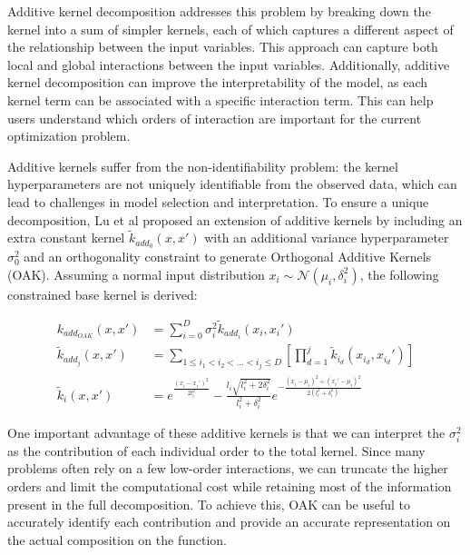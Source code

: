 \documentclass[sn-mathphys,Numbered]{sn-jnl}%
\begin{document}
Additive kernel decomposition\cite{gp-additive} addresses this problem by breaking down the kernel into a sum of simpler kernels, each of which captures a different aspect of the relationship between the input variables. This approach can capture both local and global interactions between the input variables. Additionally, additive kernel decomposition can improve the interpretability of the model, as each kernel term can be associated with a specific interaction term. This can help users understand which orders of interaction are important for the current optimization problem. 

Additive kernels suffer from the non-identifiability problem: the kernel hyperparameters are not uniquely identifiable from the observed data, which can lead to challenges in model selection and interpretation.
To ensure a unique decomposition, Lu et al\cite{gp-additive-orthogonal} proposed an extension of additive kernels by including an extra constant kernel $\tilde{k}_{add_0}(x,x')$ with an additional variance hyperparameter $\sigma_0^2$ and an orthogonality constraint to generate Orthogonal Additive Kernels (OAK)\cite{gp-additive-orthogonal}. Assuming a normal input distribution $x_i \sim \mathcal{N}(\mu_i, \delta_i^2)$, the following constrained base kernel is derived:

\begin{equation} \label{eq:additive-orthogonal}
	\begin{aligned}
		k_{add_{OAK}}(x,x') &= \sum_{i=0}^D{\sigma_i^2  \tilde{k}_{add_i}(x_i,x_i')} \\
		\tilde{k}_{add_j}(x,x') &= \sum_{1\leq i_1 < i_2 < \ldots < i_j\leq D} \left[\prod_{d=1}^{j} \tilde{k}_{i_d}(x_{i_d},x_{i_d}') \right]\\		
		\tilde{k}_i(x,x') &= e^{\frac{(x_i-x_i')^2}{2l_i^2}} - \frac{l_i\sqrt{l_i^2 + 2\delta_i^2}}{l_i^2 + \delta_i^2} e^{-\frac{(x_i-\mu_i)^2 + (x_i'-\mu_i)^2}{2(l_i^2 + \delta_i^2)}}
	\end{aligned}
\end{equation}

One important advantage of these additive kernels is that we can interpret the $\sigma_i^2$ as the contribution of each individual order to the total kernel. Since many problems often rely on a few low-order interactions, we can truncate the higher orders and limit the computational cost while retaining most of the information present in the full decomposition. To achieve this, OAK can be useful to accurately identify each contribution and provide an accurate representation on the actual composition on the function.
\end{document}
